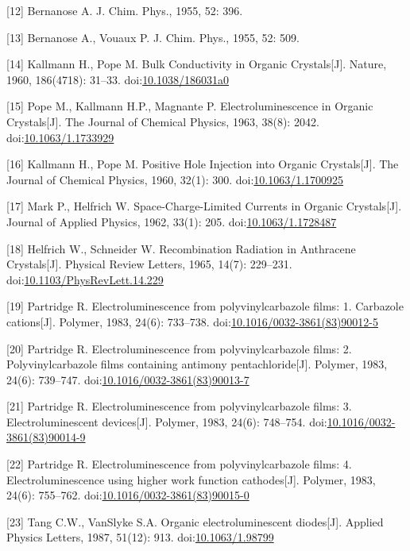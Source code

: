 \documentclass[12pt,]{report}
\begin{document}
{[}12{]} Bernanose A. J. Chim. Phys., 1955, 52: 396.

{[}13{]} Bernanose A., Vouaux P. J. Chim. Phys., 1955, 52: 509.

{[}14{]} Kallmann H., Pope M. Bulk Conductivity in Organic
Crystals{[}J{]}. Nature, 1960, 186(4718): 31--33.
doi:\href{http://dx.doi.org/10.1038/186031a0}{10.1038/186031a0}

{[}15{]} Pope M., Kallmann H.P., Magnante P. Electroluminescence in
Organic Crystals{[}J{]}. The Journal of Chemical Physics, 1963, 38(8):
2042. doi:\href{http://dx.doi.org/10.1063/1.1733929}{10.1063/1.1733929}

{[}16{]} Kallmann H., Pope M. Positive Hole Injection into Organic
Crystals{[}J{]}. The Journal of Chemical Physics, 1960, 32(1): 300.
doi:\href{http://dx.doi.org/10.1063/1.1700925}{10.1063/1.1700925}

{[}17{]} Mark P., Helfrich W. Space-Charge-Limited Currents in Organic
Crystals{[}J{]}. Journal of Applied Physics, 1962, 33(1): 205.
doi:\href{http://dx.doi.org/10.1063/1.1728487}{10.1063/1.1728487}

{[}18{]} Helfrich W., Schneider W. Recombination Radiation in Anthracene
Crystals{[}J{]}. Physical Review Letters, 1965, 14(7): 229--231.
doi:\href{http://dx.doi.org/10.1103/PhysRevLett.14.229}{10.1103/PhysRevLett.14.229}

{[}19{]} Partridge R. Electroluminescence from polyvinylcarbazole films:
1. Carbazole cations{[}J{]}. Polymer, 1983, 24(6): 733--738.
doi:\href{http://dx.doi.org/10.1016/0032-3861(83)90012-5}{10.1016/0032-3861(83)90012-5}

{[}20{]} Partridge R. Electroluminescence from polyvinylcarbazole films:
2. Polyvinylcarbazole films containing antimony pentachloride{[}J{]}.
Polymer, 1983, 24(6): 739--747.
doi:\href{http://dx.doi.org/10.1016/0032-3861(83)90013-7}{10.1016/0032-3861(83)90013-7}

{[}21{]} Partridge R. Electroluminescence from polyvinylcarbazole films:
3. Electroluminescent devices{[}J{]}. Polymer, 1983, 24(6): 748--754.
doi:\href{http://dx.doi.org/10.1016/0032-3861(83)90014-9}{10.1016/0032-3861(83)90014-9}

{[}22{]} Partridge R. Electroluminescence from polyvinylcarbazole films:
4. Electroluminescence using higher work function cathodes{[}J{]}.
Polymer, 1983, 24(6): 755--762.
doi:\href{http://dx.doi.org/10.1016/0032-3861(83)90015-0}{10.1016/0032-3861(83)90015-0}

{[}23{]} Tang C.W., VanSlyke S.A. Organic electroluminescent
diodes{[}J{]}. Applied Physics Letters, 1987, 51(12): 913.
doi:\href{http://dx.doi.org/10.1063/1.98799}{10.1063/1.98799}
\end{document}
